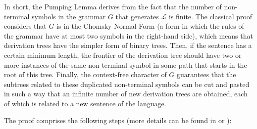 \documentclass {elsarticle}
\begin{document}
In short, the Pumping Lemma derives from the fact that the number of non-terminal symbols in the grammar $G$ that generates $\mathcal {L}$ is finite. The classical proof considers that $G$ is in the Chomsky Normal Form (a form in which the rules of the grammar have at most two symbols in the right-hand side), which means that derivation trees have the simpler form of binary trees. Then, if the sentence has a certain minimum length, the frontier of the derivation tree should have two or more instances of the same non-terminal symbol in some path that starts in the root of this tree. Finally, the context-free character of $G$ guarantees that the subtrees related to these duplicated non-terminal symbols can be cut and pasted in such a way that an infinite number of new derivation trees are obtained, each of which is related to a new sentence of the language.

The proof comprises the following steps (more details can be found in \cite {sudkamp-2006} or \cite {ramos-2009}):
\end{document}

